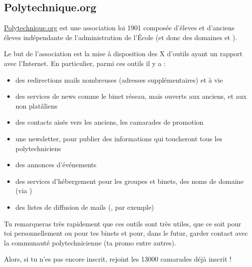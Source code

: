 \subsection{Polytechnique.org}
\url{Polytechnique.org} est une association loi 1901 compos\'ee d'\'eleves et d'anciens \'eleves 
 ind\'ependante de l'administration de l'\'Ecole (et donc des domaines 
 et ).


Le but de l'association est la mise \`a disposition des X d'outils ayant un rapport avec l'Internet. En particulier, parmi ces outils il y a :
\begin{itemize}
  \item des redirections mails nombreuses (adresses suppl\'ementaires) et \`a vie
  \item des services de news comme le binet r\'eseau, mais ouverts aux anciens, et aux non plat\^aliens
  \item des contacts ais\'es vers les anciens, les camarades de promotion
  \item une newsletter, pour publier des informations qui toucheront tous les polytechniciens
  \item des annonces d'\'ev\'enements
  \item des services d'h\'ebergement pour les groupes et binets, des noms de domaine (via )
  \item des listes de diffusion de mails (, par exemple)
\end{itemize}


Tu remarqueras tr\`es rapidement que ces outils sont tr\`es utiles, que ce soit pour toi personnellement ou pour tes binets et pour, dans le futur, garder contact avec la communaut\'e polytechnicienne (ta promo entre autres).


Alors, si tu n'es pas encore inscrit, rejoint les 13000 camarades d\'ej\`a inscrit !

